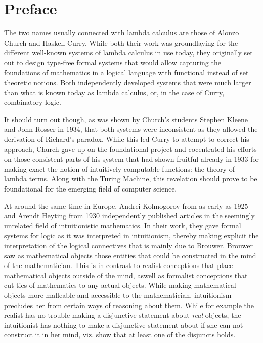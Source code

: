 \chapter{Preface}

The two names usually connected with lambda calculus are those of Alonzo Church
and Haskell Curry. While both their work was groundlaying for the different
well-known systems of lambda calculus in use today, they originally set out to
design type-free formal systems that would allow capturing the foundations of
mathematics in a logical language with functional instead of set theoretic
notions. Both independently developed systems that were much larger than what is
known today as lambda calculus, or, in the case of Curry, combinatory logic.

It should turn out though, as was shown by Church's students Stephen Kleene and
John Rosser in 1934, that both systems were inconsistent as they allowed the
derivation of Richard's paradox. While this led Curry to attempt to correct his
approach, Church gave up on the foundational project and cocentrated his efforts
on those consistent parts of his system that had shown fruitful already in 1933
for making exact the notion of intuitively computable functions: the theory of
lambda terms. Along with the Turing Machine, this revelation should prove to be
foundational for the emerging field of computer science.

At around the same time in Europe, Andrei Kolmogorov from as early as 1925 and
Arendt Heyting from 1930 independently published articles in the seemingly
unrelated field of intuitionistic mathematics. In their work, they gave formal
systems for logic as it was interpreted in intuitionism, thereby making explicit
the interpretation of the logical connectives that is mainly due to Brouwer.
Brouwer saw as mathematical objects those entities that could be constructed in
the mind of the mathematician. This is in contrast to realist conceptions that
place mathematical objects outside of the mind, aswell as formalist conceptions
that cut ties of mathematics to any actual objects. While making mathematical
objects more malleable and accessible to the mathematician, intuitionism
precludes her from certain ways of reasoning about them. While for example the
realist has no trouble making a disjunctive statement about \textit{real}
objects, the intuitionist has nothing to make a disjunctive statement about if
she can not construct it in her mind, viz. show that at least one of the
disjuncts holds.

